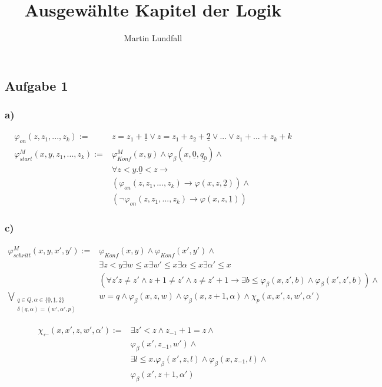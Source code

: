 \documentclass[12pt]{article}
\begin{document}
\title{Ausgewählte Kapitel der Logik}
\author{Martin Lundfall}
\maketitle



\subsection*{Aufgabe 1}
\subsubsection*{a)}
\begin{align*}
  \varphi_{on}(z, z_1,...,z_k):=&z=z_1+\underline{1}\lor z = z_1 + z_2 + \underline{2} \lor ... \lor z_1 + ... +z_k + k \\
  \varphi_{start}^M(x,y,z_1,...,z_k) := &\varphi_{Konf}^M(x,y) \land
  \varphi_\beta(x,\underline{0},\underline{q_0}) \land \\
  &\forall z < y. \underline{0} < z \rightarrow \\
  &(\varphi_{on}(z, z_1, ..., z_k) \rightarrow \varphi(x,z,\underline{2})) \land \\
  &(\neg\varphi_{on}(z, z_1, ..., z_k) \rightarrow \varphi(x,z,\underline{1}))
\end{align*}

\subsubsection*{c)}
\begin{align*}
  \varphi_{schritt}^M(x,y,x',y') :=& \varphi_{Konf}(x,y) \land \varphi_{Konf}(x',y') \land \\
  & \exists z < y \exists w \leq x \exists w' \leq x \exists \alpha \leq x \exists \alpha' \leq x\\
  &(\forall z' z\neq z'\land z+1\neq z'\land z\neq z'+1 \rightarrow \exists b\leq \varphi_\beta(x,z',b)\land\varphi_\beta(x',z',b))\land \\
  \bigvee_{\substack{q\in Q,\alpha\in\{\underline{0},\underline{1},\underline{2}\} \\ \delta(q,\alpha)=(w',\alpha',p)}} &
  w=q \land \varphi_\beta(x,z,w) \land \varphi_\beta(x,z+1,\alpha) \land \chi_p(x,x',z,w',\alpha')
\end{align*}

\begin{align*}
  \chi_{\leftarrow}(x,x',z,w',\alpha') := &\exists z'<z \land z_{-1} + 1 = z \land \\
  &\varphi_\beta(x', z_{-1}, w')  \land \\
  &\exists l\leq x.\varphi_\beta(x', z, l)\land \varphi_\beta(x, z_{-1}, l) \land \\
  &\varphi_\beta(x',z+1,\alpha') \\
\end{align*}
\end{document}
